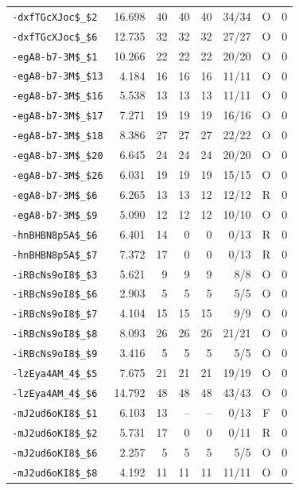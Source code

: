{\begin{longtable}{lrrrrrcc}
\texttt{-dxfTGcXJoc\$\_\$2} & 16.698 & 40 & 40 & 40 & 34/34 & O & 0 \\
\texttt{-dxfTGcXJoc\$\_\$6} & 12.735 & 32 & 32 & 32 & 27/27 & O & 0 \\
\texttt{-egA8-b7-3M\$\_\$1} & 10.266 & 22 & 22 & 22 & 20/20 & O & 0 \\
\texttt{-egA8-b7-3M\$\_\$13} & 4.184 & 16 & 16 & 16 & 11/11 & O & 0 \\
\texttt{-egA8-b7-3M\$\_\$16} & 5.538 & 13 & 13 & 13 & 11/11 & O & 0 \\
\texttt{-egA8-b7-3M\$\_\$17} & 7.271 & 19 & 19 & 19 & 16/16 & O & 0 \\
\texttt{-egA8-b7-3M\$\_\$18} & 8.386 & 27 & 27 & 27 & 22/22 & O & 0 \\
\texttt{-egA8-b7-3M\$\_\$20} & 6.645 & 24 & 24 & 24 & 20/20 & O & 0 \\
\texttt{-egA8-b7-3M\$\_\$26} & 6.031 & 19 & 19 & 19 & 15/15 & O & 0 \\
\texttt{-egA8-b7-3M\$\_\$6} & 6.265 & 13 & 13 & 12 & 12/12 & R & 0 \\
\texttt{-egA8-b7-3M\$\_\$9} & 5.090 & 12 & 12 & 12 & 10/10 & O & 0 \\
\texttt{-hnBHBN8p5A\$\_\$6} & 6.401 & 14 & 0 & 0 & 0/13 & R & 0 \\
\texttt{-hnBHBN8p5A\$\_\$7} & 7.372 & 17 & 0 & 0 & 0/13 & R & 0 \\
\texttt{-iRBcNs9oI8\$\_\$3} & 5.621 & 9 & 9 & 9 & 8/8 & O & 0 \\
\texttt{-iRBcNs9oI8\$\_\$6} & 2.903 & 5 & 5 & 5 & 5/5 & O & 0 \\
\texttt{-iRBcNs9oI8\$\_\$7} & 4.104 & 15 & 15 & 15 & 9/9 & O & 0 \\
\texttt{-iRBcNs9oI8\$\_\$8} & 8.093 & 26 & 26 & 26 & 21/21 & O & 0 \\
\texttt{-iRBcNs9oI8\$\_\$9} & 3.416 & 5 & 5 & 5 & 5/5 & O & 0 \\
\texttt{-lzEya4AM\_4\$\_\$5} & 7.675 & 21 & 21 & 21 & 19/19 & O & 0 \\
\texttt{-lzEya4AM\_4\$\_\$6} & 14.792 & 48 & 48 & 48 & 43/43 & O & 0 \\
\texttt{-mJ2ud6oKI8\$\_\$1} & 6.103 & 13 & -- & -- & 0/13 & F & 0 \\
\texttt{-mJ2ud6oKI8\$\_\$2} & 5.731 & 17 & 0 & 0 & 0/11 & R & 0 \\
\texttt{-mJ2ud6oKI8\$\_\$6} & 2.257 & 5 & 5 & 5 & 5/5 & O & 0 \\
\texttt{-mJ2ud6oKI8\$\_\$8} & 4.192 & 11 & 11 & 11 & 11/11 & O & 0 \\

\end{longtable}}
